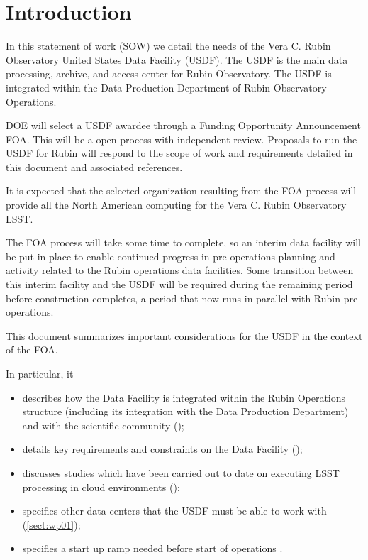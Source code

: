 \section{Introduction}
\label{sect:intro}

In this statement of work (SOW) we detail the needs of the Vera C. Rubin Observatory United States Data Facility (USDF). The USDF is the main data processing, archive, and access center for Rubin Observatory. The USDF is integrated within the Data Production Department of Rubin Observatory Operations.


DOE will select a USDF awardee through a Funding Opportunity Announcement \gls{FOA}. This will be a open process with independent review. Proposals to run the USDF for Rubin will respond to the scope of work and requirements detailed in this document and associated references.

It is expected that the selected organization resulting from the \gls{FOA}
process will provide all the North American computing for the Vera C. Rubin Observatory \gls{LSST}.

The FOA process will take some time to complete, so an interim data facility will be put in place to enable continued progress in pre-operations planning and activity related to the Rubin operations data facilities.
Some transition between this interim facility and the USDF will be required during the remaining period before construction completes, a period that now runs in parallel with Rubin pre-operations.

This document summarizes important considerations for the USDF in the context of the \gls{FOA}.

In particular, it
\begin{itemize}

  \item{describes how the Data Facility is integrated within the Rubin Operations structure (including its integration with the Data Production Department) and with the scientific community ();}
  \item{details key requirements and constraints on the Data Facility ();}
  \item{discusses studies which have been carried out to date on executing \gls{LSST} processing in cloud environments ();}
  \item{specifies other data centers that the USDF must be able to work with (\ref{sect:wp01});}
  \item{specifies a start up ramp needed before start of operations .}

\end{itemize}


